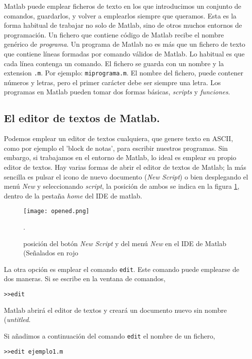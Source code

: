 Matlab puede emplear ficheros de texto en los que introducimos un conjunto de comandos, guardarlos, y volver a emplearlos siempre que queramos. Esta es la forma habitual de trabajar no solo de Matlab, sino de otros muchos entornos de programación. Un fichero que contiene código de Matlab recibe el nombre genérico de \emph{programa}. Un programa de Matlab no es más que un fichero de texto que contiene líneas formadas por comando válidos de Matlab. Lo habitual es que cada línea contenga un comando. El fichero se guarda con un nombre y la extension \texttt{.m}. Por ejemplo: \texttt{miprograma.m}. El nombre del fichero, puede contener números y letras, pero el primer carácter debe ser siempre una letra. Los programas en Matlab pueden tomar dos formas básicas, \emph{scripts} y \emph{funciones}.

\subsection{El editor de textos de Matlab.} 
Podemos emplear un editor de textos cualquiera, que genere texto en ASCII, como por ejemplo el 'block de notas', para escribir nuestros programas. Sin embargo, si trabajamos en el entorno de Matlab, lo ideal es emplear su propio editor de textos. Hay varias formas de abrir el editor de textos de Matlab; la más sencilla es pulsar  el icono de nuevo documento (\emph{New Script}) o bien desplegando el menú \emph{New} y seleccionando \emph{script}, la posición de ambos se indica en la figura \ref{fig:opened}, dentro de la pestaña \emph{home} del IDE de matlab.
\begin{figure}[h]
\centering
\texttt{[image: opened.png]}
\caption{posición del botón  \emph{New Script} y del  menú \emph{New} en el IDE de Matlab (Señalados en rojo}.
\label{fig:opened}
\end{figure}

La otra opción es emplear el comando \texttt{edit}. Este comando puede emplearse de dos maneras. Si se escribe en la ventana de comandos,

\begin{verbatim}
>>edit
\end{verbatim}
Matlab abrirá el editor de textos y creará un documento nuevo sin nombre (\emph{untitled}.

Si añadimos a continuación del comando \texttt{edit} el nombre de un fichero,
\begin{verbatim}
>>edit ejemplo1.m
\end{verbatim}

